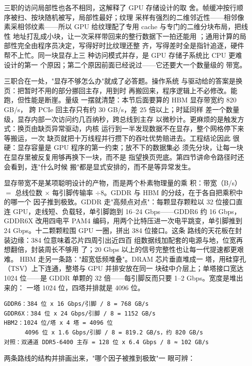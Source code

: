 三职的访问局部性也各不相同，这解释了 GPU 存储设计的取
舍。帧缓冲按行顺序被扫、按块随机被写，局部性最好；纹理
采样有强烈的二维邻近性——相邻像素采相邻纹素——所以
GPU 给纹理配了专用 cache 与专门的二维分块布局，把线性
地址打乱成小块，让一次采样带回来的整行数据下一拍还能用
；通用计算的局部性完全由程序员决定，写得好时比纹理还整
齐，写得差时全是指针追逐，硬件帮不上忙。同一块显存上三
种访问模式并存，是 GPU 存储子系统比 CPU 更难设计的第一
个原因；第二个原因前面已经说过——它还要大一个数量级的
带宽。

三职合在一处，"显存不够怎么办"就成了必答题。操作系统
与驱动给的答案是换页：把暂时不用的部分挪回主存，用到时
再搬回来，程序逻辑上不必修改。能跑，但性能是断崖。量级
一摆就清楚：本节后面要算的 HBM 显存带宽约 820 GB/s，
跨 PCIe 回主存只有约 30 GB/s，差 $25$ 倍以上；时延同样
差一个数量级，显存内部一次访问约几百纳秒，跨总线到主存
以微秒计。更麻烦的是触发方式：换页由缺页异常驱动，内核
运行到一半发现数据不在显存，整个网格停下来等搬运，一次
缺页就把十万线程并行攒下的吞吐优势赔进去。工程结论因此
很硬：显存容量是 GPU 程序的第一约束；放不下的数据集必
须先分块，让每一块在显存里被反复用够再换下一块，而不是
指望换页兜底。第四节讲命令路径时还会看到，连"什么时候
搬"都是显式安排的，而不是等异常发生。

显存带宽不是某项聪明设计的产物，而是两个朴素物理量的乘
积：带宽（B/s）$=$ 总线位数 $\times$ 每引脚传输率
$\div8$。GDDR 与 HBM 的分歧，在于各自把乘积中的哪一个
因子推到极致。GDDR 走"高频点对点"：每颗显存颗粒以
32 位接口直连 GPU，走线短、负载轻，单引脚跑到
16--24 Gbps——GDDR6 约 16 Gbps，GDDR6X 改用四电平
PAM4 编码，用两个比特压进一次电平跳变，单引脚推到
24 Gbps。十二颗颗粒围 GPU 一圈，拼出 384 位接口。这条
路线的天花板在封装边缘：384 位意味着芯片四周引出近四百
组数据线加配套的电源与地，位宽再想翻倍，封装周长不够用
了；20 Gbps 以上的信号完整性也让每一代提速都更艰难。
HBM 走另一条路："超宽低频堆叠"。DRAM 芯片垂直堆成一
塔，用硅穿孔（TSV）上下连通，整塔与 GPU 并排安放在同一
块硅中介层上；单塔接口宽达 1024 位——是 GDDR 单颗的
32 倍——每引脚反而只要 1--2 Gbps。宽度是堆出来的：
一塔 1024 位，四塔并排就是 4096 位。

\begin{lstlisting}
GDDR6：384 位 x 16 Gbps/引脚 / 8 = 768 GB/s
GDDR6X：384 位 x 24 Gbps/引脚 / 8 = 1152 GB/s
HBM2：1024 位/塔 x 4 塔 = 4096 位
      4096 位 x 1.6 Gbps/引脚 / 8 = 819.2 GB/s，约 820 GB/s
对照：双通道 DDR5-6400 主存 = 128 位 x 6.4 Gbps / 8 ≈ 102 GB/s
\end{lstlisting}

两条路线的结构并排画出来，"哪个因子被推到极致"一
眼可辨：

